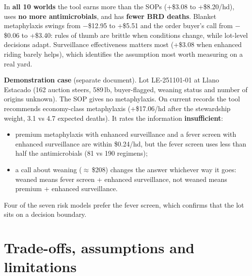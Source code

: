 \documentclass[10pt,letterpaper]{article}
\newcommand{\usd}[1]{\$#1}
\newcommand{\lead}[1]{\textbf{#1}\enspace}
\begin{document}
In \textbf{all 10 worlds} the tool earns more than the SOPs (+\usd{3.08} to +\usd{8.20}/hd), uses \textbf{no more antimicrobials}, and has \textbf{fewer BRD deaths}. Blanket metaphylaxis swings from $-$\usd{12.95} to +\usd{5.51} and the order buyer's call from $-$\usd{0.06} to +\usd{3.40}: rules of thumb are brittle when conditions change, while lot-level decisions adapt. Surveillance effectiveness matters most (+\usd{3.08} when enhanced riding barely helps), which identifies the assumption most worth measuring on a real yard.

\lead{Demonstration case} (separate document). Lot LE-251101-01 at Llano Estacado (162 auction steers, 589\,lb, buyer-flagged, weaning status and number of origins unknown). The SOP gives no metaphylaxis. On current records the tool recommends economy-class metaphylaxis (+\usd{17.06}/hd after the stewardship weight, 3.1 vs 4.7 expected deaths). It rates the information \textbf{insufficient}:
\begin{itemize}
  \item premium metaphylaxis with enhanced surveillance and a fever screen with enhanced surveillance are within \usd{0.24}/hd, but the fever screen uses less than half the antimicrobials (81 vs 190 regimens);
  \item a call about weaning ($\approx$\,\usd{208}) changes the answer whichever way it goes: weaned means fever screen + enhanced surveillance, not weaned means premium + enhanced surveillance.
\end{itemize}
Four of the seven risk models prefer the fever screen, which confirms that the lot sits on a decision boundary.

\section{Trade-offs, assumptions and limitations}
\end{document}
